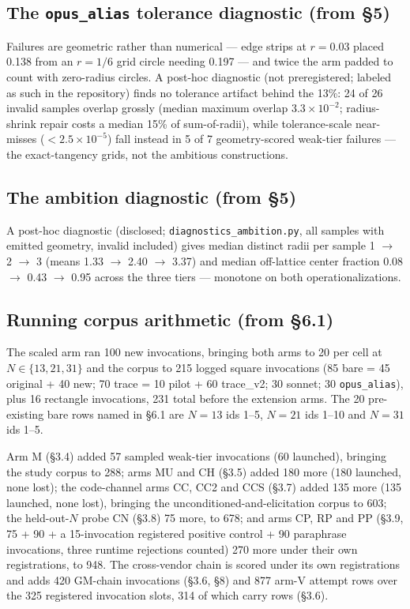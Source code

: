 \subsection{The \texttt{opus\_alias} tolerance diagnostic (from \S5)}

Failures are geometric rather than numerical --- edge strips at $r = 0.03$ placed 0.138 from an
$r = 1/6$ grid circle needing 0.197 --- and twice the arm padded to count with zero-radius circles.
A post-hoc diagnostic (not preregistered; labeled as such in the repository) finds no tolerance
artifact behind the 13\%: 24 of 26 invalid samples overlap grossly (median maximum overlap
$3.3\times10^{-2}$; radius-shrink repair costs a median 15\% of sum-of-radii), while tolerance-scale
near-misses ($< 2.5\times10^{-5}$) fall instead in 5 of 7 geometry-scored weak-tier failures --- the
exact-tangency grids, not the ambitious constructions.

\subsection{The ambition diagnostic (from \S5)}

A post-hoc diagnostic (disclosed; \texttt{diagnostics\_ambition.py}, all samples with emitted
geometry, invalid included) gives median distinct radii per sample 1 $\rightarrow$ 2 $\rightarrow$ 3
(means 1.33 $\rightarrow$ 2.40 $\rightarrow$ 3.37) and median off-lattice center fraction 0.08
$\rightarrow$ 0.43 $\rightarrow$ 0.95 across the three tiers --- monotone on both operationalizations.

\subsection{Running corpus arithmetic (from \S6.1)}

The scaled arm ran 100 new invocations, bringing both arms to 20 per cell at
$N \in \{13, 21, 31\}$ and the corpus to 215 logged square invocations (85 bare = 45 original + 40
new; 70 trace = 10 pilot + 60 trace\_v2; 30 sonnet; 30 \texttt{opus\_alias}), plus 16 rectangle
invocations, 231 total before the extension arms. The 20 pre-existing bare rows named in \S6.1 are
$N = 13$ ids 1--5, $N = 21$ ids 1--10 and $N = 31$ ids 1--5.

Arm M (\S3.4) added 57 sampled weak-tier invocations (60 launched), bringing the study corpus to
288; arms MU and CH (\S3.5) added 180 more (180 launched, none lost); the code-channel arms CC, CC2
and CCS (\S3.7) added 135 more (135 launched, none lost), bringing the unconditioned-and-elicitation
corpus to 603; the held-out-$N$ probe CN (\S3.8) 75 more, to 678; and arms CP, RP and PP (\S3.9,
75 + 90 + a 15-invocation registered positive control + 90 paraphrase invocations, three runtime rejections counted) 270 more under their own registrations, to 948. The cross-vendor chain is
scored under its own registrations and adds 420 GM-chain invocations (\S3.6, \S8) and 877 arm-V
attempt rows over the 325 registered invocation slots, 314 of which carry rows (\S3.6).

